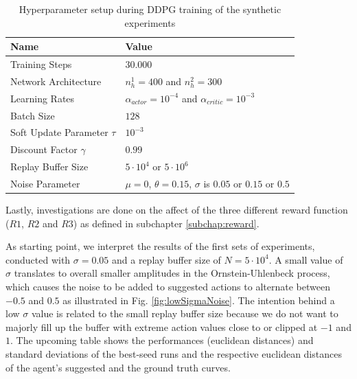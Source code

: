 \begin{table}[H]
\centering
\begin{tabular}{|l|l|}
\hline
\textbf{Name}                & \textbf{Value}                                                \\ \hline
Training Steps               & $30.000$                                                      \\ \hline
Network Architecture         & $n_{h}^{1}=400$ and $n_{h}^{2}=300$       \\ \hline
Learning Rates               & $\alpha_{actor} = 10^{-4}$ and $\alpha_{critic}= 10^{-3}$     \\ \hline
Batch Size                   & $128$                                                         \\ \hline
Soft Update Parameter $\tau$ & $10^{-3}$                                                     \\ \hline
Discount Factor $\gamma$     & $0.99$                                                        \\ \hline
Replay Buffer Size           & $5\cdot 10^4$ or $5 \cdot 10^6$                               \\ \hline
Noise Parameter              & $\mu=0$, $\theta=0.15$, $\sigma$ is $0.05$ or $0.15$ or $0.5$ \\ \hline
\end{tabular}
\caption{\label{tab:hyperDDPG} Hyperparameter setup during DDPG training of the synthetic experiments}
\end{table}
\par
Lastly, investigations are done on the affect of the three different reward function ($R1$, $R2$ and $R3$) as defined in subchapter \ref{subchap:reward}.
\par
As starting point, we interpret the results of the first sets of experiments, conducted with $\sigma=0.05$ and a replay buffer size of $N=5 \cdot 10^4$. A small value of $\sigma$ translates to overall smaller amplitudes in the Ornstein-Uhlenbeck process, which causes the noise to be added to suggested actions to alternate between $-0.5$ and $0.5$ as illustrated in Fig. \ref{fig:lowSigmaNoise}. The intention behind a low $\sigma$ value is related to the small replay buffer size because we do not want to majorly fill up the buffer with extreme action values close to or clipped at $-1$ and $1$. The upcoming table shows the performances (euclidean distances) and standard deviations of the best-seed runs and the respective euclidean distances of the agent's suggested and the ground truth curves.

